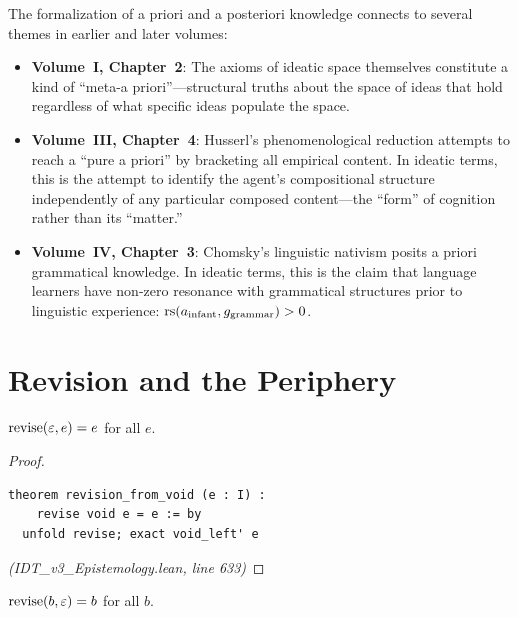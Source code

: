 \begin{remark}
The formalization of a priori and a posteriori knowledge connects to several
themes in earlier and later volumes:

\begin{itemize}
\item \textbf{Volume~I, Chapter~2}: The axioms of ideatic space themselves
  constitute a kind of ``meta-a priori''---structural truths about the space
  of ideas that hold regardless of what specific ideas populate the space.
\item \textbf{Volume~III, Chapter~4}: Husserl's phenomenological reduction
  attempts to reach a ``pure a priori'' by bracketing all empirical content.
  In ideatic terms, this is the attempt to identify the agent's compositional
  structure independently of any particular composed content---the ``form'' of
  cognition rather than its ``matter.''
\item \textbf{Volume~IV, Chapter~3}: Chomsky's linguistic nativism posits
  a priori grammatical knowledge. In ideatic terms, this is the claim that
  language learners have non-zero resonance with grammatical structures prior
  to linguistic experience: $\mathrm{rs}(a_{\text{infant}}, g_{\text{grammar}}) > 0$.
\end{itemize}
\end{remark}


\section{Revision and the Periphery}

\begin{theorem}
\label{thm:revision-void}
$\mathrm{revise}(\varepsilon, e) = e$ for all $e$.
\end{theorem}

\begin{proof}
\begin{lstlisting}
theorem revision_from_void (e : I) :
    revise void e = e := by
  unfold revise; exact void_left' e
\end{lstlisting}
\textit{(IDT\_v3\_Epistemology.lean, line 633)}
\end{proof}

\begin{theorem}
\label{thm:revision-by-void}
$\mathrm{revise}(b, \varepsilon) = b$ for all $b$.
\end{theorem}

